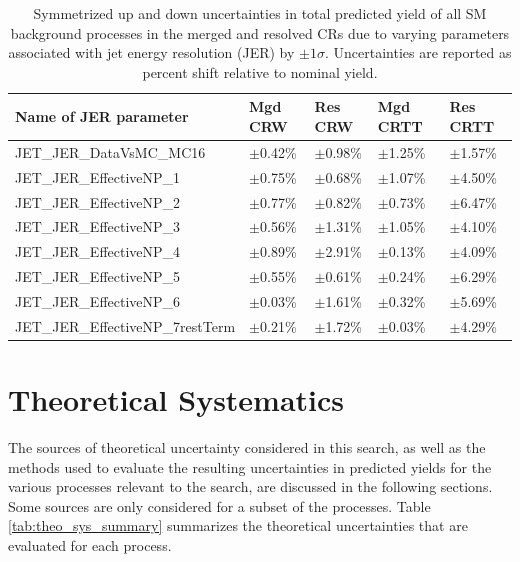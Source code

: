 \begin{table}[ht]
\caption{\label{tab:systs_total_bkg_JET_JER_CR} Symmetrized up and down uncertainties in total predicted yield of all SM background processes in the merged and resolved CRs due to varying parameters associated with jet energy resolution (JER) by \(\pm1\sigma\). Uncertainties are reported as percent shift relative to nominal yield.}
\footnotesize{
\begin{tabular}{l l l l l }
\toprule
\textbf{Name of JER parameter} & \textbf{Mgd CRW} & \textbf{Res CRW} & \textbf{Mgd CRTT} & \textbf{Res CRTT}\tabularnewline
\midrule
\midrule
JET\_JER\_DataVsMC\_MC16 & \(\pm\)0.42\% &\(\pm\)0.98\% &\(\pm\)1.25\% &\(\pm\)1.57\% \tabularnewline
\midrule
JET\_JER\_EffectiveNP\_1 & \(\pm\)0.75\% &\(\pm\)0.68\% &\(\pm\)1.07\% &\(\pm\)4.50\% \tabularnewline
\midrule
JET\_JER\_EffectiveNP\_2 & \(\pm\)0.77\% &\(\pm\)0.82\% &\(\pm\)0.73\% &\(\pm\)6.47\% \tabularnewline
\midrule
JET\_JER\_EffectiveNP\_3 & \(\pm\)0.56\% &\(\pm\)1.31\% &\(\pm\)1.05\% &\(\pm\)4.10\% \tabularnewline
\midrule
JET\_JER\_EffectiveNP\_4 & \(\pm\)0.89\% &\(\pm\)2.91\% &\(\pm\)0.13\% &\(\pm\)4.09\% \tabularnewline
\midrule
JET\_JER\_EffectiveNP\_5 & \(\pm\)0.55\% &\(\pm\)0.61\% &\(\pm\)0.24\% &\(\pm\)6.29\% \tabularnewline
\midrule
JET\_JER\_EffectiveNP\_6 & \(\pm\)0.03\% &\(\pm\)1.61\% &\(\pm\)0.32\% &\(\pm\)5.69\% \tabularnewline
\midrule
JET\_JER\_EffectiveNP\_7restTerm & \(\pm\)0.21\% &\(\pm\)1.72\% &\(\pm\)0.03\% &\(\pm\)4.29\% \tabularnewline
\bottomrule
\end{tabular}}
\end{table}

\section{Theoretical Systematics}

The sources of theoretical uncertainty considered in this search, as well as the methods used to evaluate the resulting uncertainties in predicted yields for the various processes relevant to the search, are discussed in the following sections.  Some sources are only considered for a subset of the processes. Table \ref{tab:theo_sys_summary} summarizes the theoretical uncertainties that are evaluated for each process.

